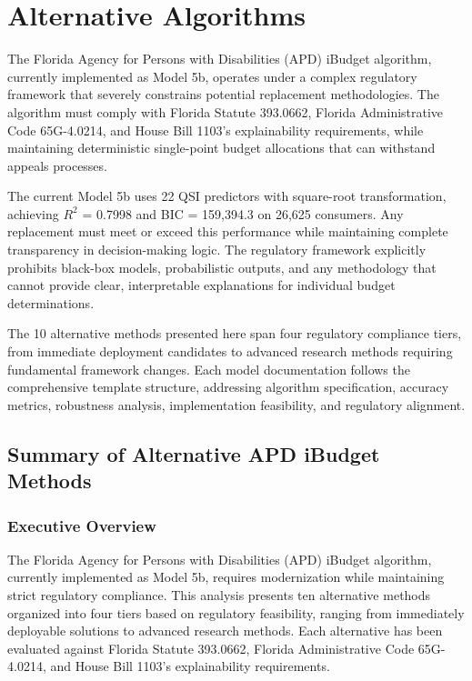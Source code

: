 \chapter{Alternative Algorithms}  \newpage


The Florida Agency for Persons with Disabilities (APD) iBudget algorithm, currently implemented as Model 5b, operates under a complex regulatory framework that severely constrains potential replacement methodologies. The algorithm must comply with Florida Statute 393.0662, Florida Administrative Code 65G-4.0214, and House Bill 1103's explainability requirements, while maintaining deterministic single-point budget allocations that can withstand appeals processes.

The current Model 5b uses 22 QSI predictors with square-root transformation, achieving $R^2$ = 0.7998 and BIC = 159,394.3 on 26,625 consumers. Any replacement must meet or exceed this performance while maintaining complete transparency in decision-making logic. The regulatory framework explicitly prohibits black-box models, probabilistic outputs, and any methodology that cannot provide clear, interpretable explanations for individual budget determinations.

The 10 alternative methods presented here span four regulatory compliance tiers, from immediate deployment candidates to advanced research methods requiring fundamental framework changes. Each model documentation follows the comprehensive template structure, addressing algorithm specification, accuracy metrics, robustness analysis, implementation feasibility, and regulatory alignment.






 \section{Summary of Alternative APD iBudget Methods}

 \subsection{Executive Overview}

 The Florida Agency for Persons with Disabilities (APD) iBudget algorithm, currently implemented as Model 5b, requires modernization while maintaining strict regulatory compliance. This analysis presents ten alternative methods organized into four tiers based on regulatory feasibility, ranging from immediately deployable solutions to advanced research methods. Each alternative has been evaluated against Florida Statute 393.0662, Florida Administrative Code 65G-4.0214, and House Bill 1103's explainability requirements.

